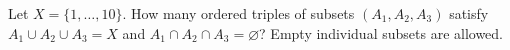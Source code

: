 Let $X=\{1,\ldots,10\}$. How many ordered triples of subsets $(A_1,A_2,A_3)$ satisfy $A_1\cup A_2\cup A_3=X$ and $A_1\cap A_2\cap A_3=\varnothing$? Empty individual subsets are allowed.
